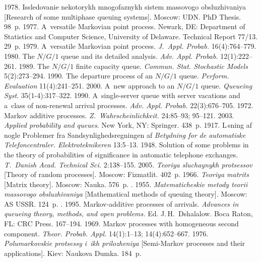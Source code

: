 {\begin{multicols}{2}
{{\begin{thebibliography}{99}
   1978. Issledovanie nekotorykh mnogofaznykh sistem massovogo 
obsluzhivaniya [Research of some multiphase queuing systems].  Moscow: UDN. 
 PhD Thesis. 98~p.
   1977. A~versatile Markovian point process. 
  Newark, DE: Department of Statistics and Computer Science, 
  University of Delaware. Technical Report 77/13.  29~p.
   1979. A~versatile Markovian point process. 
  \textit{J.~Appl. Probab.} 
16(4):764--779.
   1980. The $N/G/1$ queue and its detailed analysis. \textit{Adv. Appl. 
Probab.} 12(1):222--261.
   1989. The $N/G/1$ finite capacity queue. \textit{Commun. 
Stat. Stochastic Models} 5(2):273--294.
   1990. The departure process of an $N/G/1$ queue. \textit{Perform. 
Evaluation} 11(4):241--251.
   2000. A~new approach to an $N/G/1$ queue. \textit{Queueing 
Syst.} 35(1-4):317--322.
   1990. A~single-server queue 
with server vacations and a~class of non-renewal arrival processes. 
\textit{Adv. Appl. Probab.} 
22(3):676--705.
   1972. Markov additive processes. \textit{Z.~Wahrscheinlichkeit.}
  24:85--93; 95--121. 
   2003. \textit{Applied probability and queues}. New York, NY:  Springer. 
438~p.
   1917. \mbox{L{\!\ptb{\o}}\,sning} af nogle Problemer fra 
Sandsynlighedsregningen af \textit{Betydning for de automatiske Telefoncentraler. 
Elektroteknikeren} 13:5--13.
   1948. Solution of some problems in the theory of probabilities of 
significance in automatic telephone exchanges. \textit{T.~Danish Acad. 
Technical Sci.} 2:138--155.
   2005. \textit{Teoriya sluchaynykh protsessov} 
[Theory of random processes]. Moscow: Fizmatlit. 402~p.
   1966. \textit{Teoriya matrits} [Matrix theory]. Moscow: Nauka. 
576~p.
  . 1955. \textit{Matematicheskie metody teorii massovogo 
obsluzhivaniya} [Mathematical methods of queuing theory]. Moscow: 
AS USSR. 124~p. 
  . 1995. 
  Markov-additive processes of arrivals. 
\textit{Advances in queueing theory, methods, and open problems.} 
Ed. J.\,H.~Dshalalow. Boca 
Raton, FL: CRC Press. 167--194.
   1969. 
  Markov processes with homogeneous second component. \textit{Theor.
   Probab. Appl.} 14(1):1--13;  
14(4):652--667.
   1976. \textit{Polumarkovskie protsessy i~ikh 
prilozheniya} [Semi-Markov processes and their applications]. Kiev: Naukova Dumka. 184~p.


\end{thebibliography}}}
\end{multicols}}
